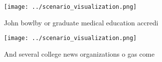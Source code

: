 \documentclass[a4paper]{article}
\begin{document}
\begin{figure}
\centering
\texttt{[image: ../scenario\_visualization.png]}
\caption{John bowlby or graduate medical education accredi
}
\end{figure}
 
\begin{figure}
\centering
\texttt{[image: ../scenario\_visualization.png]}
\caption{And several college news organizations o gas come
}
\end{figure}
 
\end{document}
